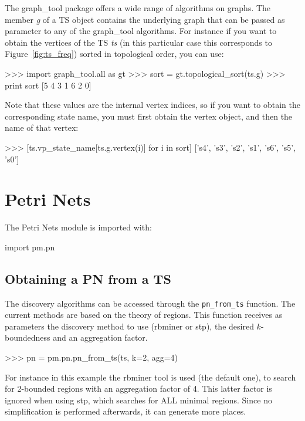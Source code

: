 \documentclass[a4paper,10pt]{book}
\begin{document}
The graph\_tool package offers a wide range of algorithms on graphs. The member \emph{g} of a TS object contains the underlying graph that can be passed as parameter to any of the graph\_tool algorithms. For instance if you want to obtain the vertices of the TS \emph{ts} (in this particular case this corresponds to Figure~\ref{fig:ts_freq}) sorted in topological order, you can use:\\
\begin{pycode}
>>> import graph_tool.all as gt
>>> sort = gt.topological_sort(ts.g)
>>> print sort
[5 4 3 1 6 2 0]
\end{pycode}
Note that these values are the internal vertex indices, so if you want to obtain the corresponding state name, you must first obtain the vertex object, and then the name of that vertex:\\ 
\begin{pycode}
>>> [ts.vp_state_name[ts.g.vertex(i)] for i in sort]
['s4', 's3', 's2', 's1', 's6', 's5', 's0']
\end{pycode}

\chapter{Petri Nets}
The Petri Nets module is imported with:\\
\begin{pycode}
import pm.pn
\end{pycode}

\section{Obtaining a PN from a TS}
The discovery algorithms can be accessed through the \texttt{pn\_from\_ts} function. The current methods are based on the theory of regions. This function receives as parameters the discovery method to use (rbminer or stp), the desired $k$-boundedness and an aggregation factor.\\

\begin{pycode}
>>> pn = pm.pn.pn_from_ts(ts, k=2, agg=4)
\end{pycode}

For instance in this example the rbminer tool is used (the default one), to search for 2-bounded regions with an aggregation factor of 4. This latter factor is ignored when using stp, which searches for ALL minimal regions. Since no simplification is performed afterwards, it can generate more places.
\end{document}
